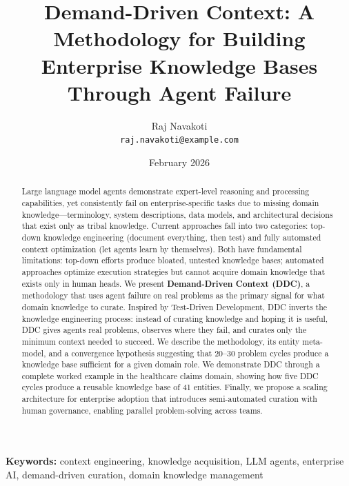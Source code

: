 \documentclass[11pt,a4paper]{article}
\title{\textbf{Demand-Driven Context: A Methodology for Building Enterprise Knowledge Bases Through Agent Failure}}
\author{
  Raj Navakoti \\
  \texttt{raj.navakoti@example.com}
}
\date{February 2026}
\begin{document}
\maketitle

\begin{abstract}
Large language model agents demonstrate expert-level reasoning and processing capabilities, yet consistently fail on enterprise-specific tasks due to missing domain knowledge---terminology, system descriptions, data models, and architectural decisions that exist only as tribal knowledge. Current approaches fall into two categories: top-down knowledge engineering (document everything, then test) and fully automated context optimization (let agents learn by themselves). Both have fundamental limitations: top-down efforts produce bloated, untested knowledge bases; automated approaches optimize execution strategies but cannot acquire domain knowledge that exists only in human heads. We present \textbf{Demand-Driven Context (DDC)}, a methodology that uses agent failure on real problems as the primary signal for what domain knowledge to curate. Inspired by Test-Driven Development, DDC inverts the knowledge engineering process: instead of curating knowledge and hoping it is useful, DDC gives agents real problems, observes where they fail, and curates only the minimum context needed to succeed. We describe the methodology, its entity meta-model, and a convergence hypothesis suggesting that 20--30 problem cycles produce a knowledge base sufficient for a given domain role. We demonstrate DDC through a complete worked example in the healthcare claims domain, showing how five DDC cycles produce a reusable knowledge base of 41 entities. Finally, we propose a scaling architecture for enterprise adoption that introduces semi-automated curation with human governance, enabling parallel problem-solving across teams.
\end{abstract}

\noindent\textbf{Keywords:} context engineering, knowledge acquisition, LLM agents, enterprise AI, demand-driven curation, domain knowledge management

\vspace{1em}

\end{document}

